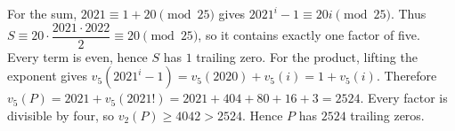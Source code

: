 For the sum, $2021\equiv1+20\pmod{25}$ gives $2021^i-1\equiv20i\pmod{25}$. Thus $S\equiv20\cdot\dfrac{2021\cdot2022}{2}\equiv20\pmod{25}$, so it contains exactly one factor of five. Every term is even, hence $S$ has $\boxed1$ trailing zero. For the product, lifting the exponent gives $v_5(2021^i-1)=v_5(2020)+v_5(i)=1+v_5(i)$. Therefore $v_5(P)=2021+v_5(2021!)=2021+404+80+16+3=2524$. Every factor is divisible by four, so $v_2(P)\ge4042>2524$. Hence $P$ has $\boxed{2524}$ trailing zeros.
